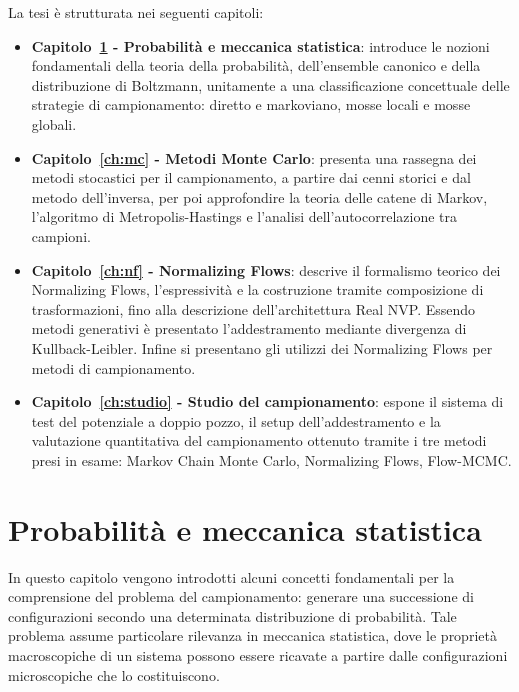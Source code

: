 La tesi è strutturata nei seguenti capitoli:
\begin{itemize}
    \item \textbf{Capitolo~\ref{ch:stat_mecstat} - Probabilità e meccanica statistica}: introduce le nozioni fondamentali della teoria della probabilità, dell'ensemble canonico e della distribuzione di Boltzmann, unitamente a una classificazione concettuale delle strategie di campionamento: diretto e markoviano, mosse locali e mosse globali.
    
    \item \textbf{Capitolo~\ref{ch:mc} - Metodi Monte Carlo}: presenta una rassegna dei metodi stocastici per il campionamento, a partire dai cenni storici e dal metodo dell'inversa, per poi approfondire la teoria delle catene di Markov, l'algoritmo di Metropolis-Hastings e l'analisi dell'autocorrelazione tra campioni.
    
    \item \textbf{Capitolo~\ref{ch:nf} - Normalizing Flows}: descrive il formalismo teorico dei Normalizing Flows, l'espressività e la costruzione tramite composizione di trasformazioni, fino alla descrizione dell'architettura Real NVP. Essendo metodi generativi è presentato l'addestramento mediante divergenza di Kullback-Leibler. Infine si presentano gli utilizzi dei Normalizing Flows per metodi di campionamento.
    
    \item \textbf{Capitolo~\ref{ch:studio} - Studio del campionamento}: espone il sistema di test del potenziale a doppio pozzo, il setup dell'addestramento e la valutazione quantitativa del campionamento ottenuto tramite i tre metodi presi in esame: Markov Chain Monte Carlo, Normalizing Flows, Flow-MCMC.
\end{itemize}

\blankpage

\chapter{Probabilità e meccanica statistica}
\label{ch:stat_mecstat}
In questo capitolo vengono introdotti alcuni concetti fondamentali per la comprensione del problema del campionamento: generare una successione di configurazioni secondo una determinata distribuzione di probabilità. Tale problema assume particolare rilevanza in meccanica statistica, dove le proprietà macroscopiche di un sistema possono essere ricavate a partire dalle configurazioni microscopiche che lo costituiscono.

